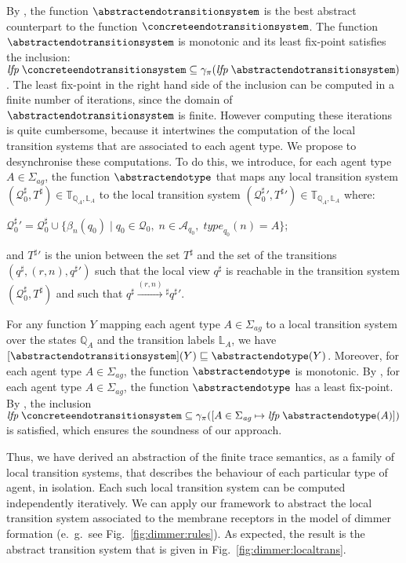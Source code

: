 \documentclass[10pt,a4paper]{llncs}
\newcommand{\agentname}{\signaturesymb_{\textit{ag}}}
\newcommand{\signaturesymb}{\Sigma}
\newcommand{\agents}[1][]{\mathcal{A}_{#1}}
\newcommand{\type}[1][]{\textit{type}_{#1}}
\newcommand{\states}{\mathbb{Q}}
\newcommand{\localstates}[1][A]{\states_{#1}}
\newcommand{\labels}{\mathbb{L}}
\newcommand{\locallabels}[1][A]{\labels_{#1}}
\newcommand{\eg}{e.~g.}
\newcommand{\transitionsystems}[1][\states,\labels]{\mathbb{T}_{#1}}
\newcommand{\lfp}[1]{\textit{lfp}\;#1}
\newcommand{\gammacomposite}{\gamma_{\pi}}
\begin{document}
 By \cite{Cousot1979}, the function $\abstractendotransitionsystem$ is the best abstract counterpart to the function $\concreteendotransitionsystem$. The function $\abstractendotransitionsystem$ is monotonic and its least fix-point satisfies the inclusion:  $\lfp \concreteendotransitionsystem \subseteq \gammacomposite(\lfp \abstractendotransitionsystem)$. The least fix-point in the right hand side of the inclusion can be computed in a finite number of iterations, since the domain of $\abstractendotransitionsystem$ is finite. However computing these iterations is quite cumbersome, because it intertwines the computation of the local transition systems that are associated to each agent type. We propose to desynchronise these computations. To do this, we introduce, for each agent type $A\in\agentname$, the function $\abstractendotype$ that maps any local transition system $(\mathcal{Q}^{\sharp}_0,T^{\sharp})\in\transitionsystems[\localstates,\locallabels]$ to the local transition system $(\mathcal{Q}^{\sharp}_0{}',T^{\sharp}{}')\in\transitionsystems[\localstates,\locallabels]$
where: \begin{inparaenum}\item $\mathcal{Q}^{\sharp}_0{}'=\mathcal{Q}^{\sharp}_0{}\cup\{\beta_n(q_0)\;|\;q_0\in \mathcal{Q}_0,\;n\in\agents[q_0],\;\type[q_0](n)=A \}$;
\item and $T^{\sharp}{}'$ is the union between the set $T^{\sharp}$
and the set of the transitions $(q^{\sharp},(r,n),q^{\sharp}{}')$
such that the local view $q^{\sharp}$ is reachable in the transition system $(\mathcal{Q}^{\sharp}_0,T^{\sharp})$ and such that $q^{\sharp}  \xrightarrow{(r,n)}{\!\!}^{\sharp} q^{\sharp}{}'$.  \end{inparaenum}

For any function $Y$ mapping each agent type $A\in\agentname$ to a local transition system over the states $\localstates$ and the transition labels $\locallabels$, we have $[\abstractendotransitionsystem](Y) \sqsubseteq \abstractendotype(Y)$. Moreover, for each agent type $A\in\agentname$, the function $\abstractendotype$ is monotonic. By \cite{Tarski}, for each agent type $A\in\agentname$, the function $\abstractendotype$ has a least fix-point.
By \cite{Cousot1979}, the inclusion $\lfp \concreteendotransitionsystem\subseteq \gammacomposite([A\in\agentname \mapsto \lfp \abstractendotype(A)])$ is satisfied, which ensures the soundness of our approach.

Thus, we have derived an abstraction of the finite trace semantics, as a family of local transition systems, that describes the behaviour of each particular type of agent, in isolation. Each such local transition system can be computed independently iteratively.  We can apply our framework to abstract the local transition system associated to the membrane receptors in the model of dimmer formation (\eg~see Fig.~\ref{fig:dimmer:rules}). As expected, the result is the abstract transition system that is given in Fig.~\ref{fig:dimmer:localtrans}.
\end{document}
